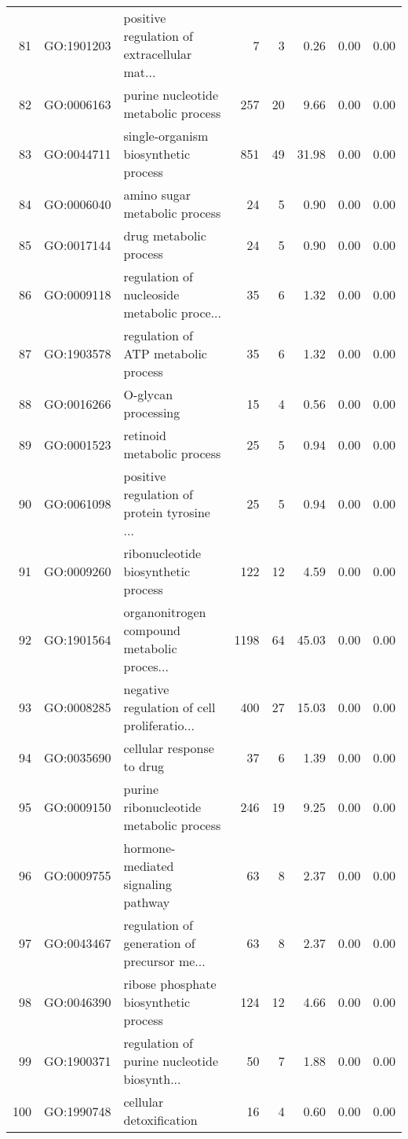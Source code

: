 \begin{table}[ht]
\begin{tabular}{rllrrrrr}
  81 & GO:1901203 & positive regulation of extracellular mat... &   7 &   3 & 0.26 & 0.00 & 0.00 \\ 
  82 & GO:0006163 & purine nucleotide metabolic process & 257 &  20 & 9.66 & 0.00 & 0.00 \\ 
  83 & GO:0044711 & single-organism biosynthetic process & 851 &  49 & 31.98 & 0.00 & 0.00 \\ 
  84 & GO:0006040 & amino sugar metabolic process &  24 &   5 & 0.90 & 0.00 & 0.00 \\ 
  85 & GO:0017144 & drug metabolic process &  24 &   5 & 0.90 & 0.00 & 0.00 \\ 
  86 & GO:0009118 & regulation of nucleoside metabolic proce... &  35 &   6 & 1.32 & 0.00 & 0.00 \\ 
  87 & GO:1903578 & regulation of ATP metabolic process &  35 &   6 & 1.32 & 0.00 & 0.00 \\ 
  88 & GO:0016266 & O-glycan processing &  15 &   4 & 0.56 & 0.00 & 0.00 \\ 
  89 & GO:0001523 & retinoid metabolic process &  25 &   5 & 0.94 & 0.00 & 0.00 \\ 
  90 & GO:0061098 & positive regulation of protein tyrosine ... &  25 &   5 & 0.94 & 0.00 & 0.00 \\ 
  91 & GO:0009260 & ribonucleotide biosynthetic process & 122 &  12 & 4.59 & 0.00 & 0.00 \\ 
  92 & GO:1901564 & organonitrogen compound metabolic proces... & 1198 &  64 & 45.03 & 0.00 & 0.00 \\ 
  93 & GO:0008285 & negative regulation of cell proliferatio... & 400 &  27 & 15.03 & 0.00 & 0.00 \\ 
  94 & GO:0035690 & cellular response to drug &  37 &   6 & 1.39 & 0.00 & 0.00 \\ 
  95 & GO:0009150 & purine ribonucleotide metabolic process & 246 &  19 & 9.25 & 0.00 & 0.00 \\ 
  96 & GO:0009755 & hormone-mediated signaling pathway &  63 &   8 & 2.37 & 0.00 & 0.00 \\ 
  97 & GO:0043467 & regulation of generation of precursor me... &  63 &   8 & 2.37 & 0.00 & 0.00 \\ 
  98 & GO:0046390 & ribose phosphate biosynthetic process & 124 &  12 & 4.66 & 0.00 & 0.00 \\ 
  99 & GO:1900371 & regulation of purine nucleotide biosynth... &  50 &   7 & 1.88 & 0.00 & 0.00 \\ 
  100 & GO:1990748 & cellular detoxification &  16 &   4 & 0.60 & 0.00 & 0.00 \\ 
   \hline
\end{tabular}
\end{table}
